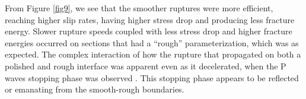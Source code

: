 \documentclass[preprint,1p, 10pt,authoryear]{elsarticle}
\begin{document}
From Figure \ref{fig9}, we see that the smoother ruptures were more efficient, reaching higher slip rates, having higher stress drop and producing less fracture energy. Slower rupture speeds coupled with less stress drop and higher fracture energies occurred on sections that had a ``rough'' parameterization, which was as expected. The complex interaction of how the rupture that propagated on both a polished and rough interface was apparent even as it decelerated, when the P waves stopping phase was observed \citep{Madariaga1976}. This stopping phase appears to be reflected or emanating from the smooth-rough boundaries.


\end{document}
